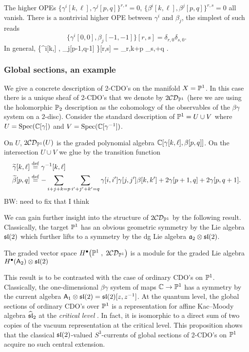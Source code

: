 \documentclass[11pt]{amsart}
\def\CDO{{\cC\cD}}
\def\brian#1{{\textcolor{blue!65!red}{BW: {#1}}}}
\begin{document}
The higher OPEs $\{\gamma^i[k,\ell], \gamma^j [p,q]\}^{r,s} = 0$, $\{\beta^i[k,\ell], \beta^j [p,q]\}^{r,s} = 0$ all vanish. 
There is a nontrivial higher OPE between $\gamma^i$ and $\beta_j$, the simplest of such reads
\[
\big\{\gamma^i[0,0] , \beta_j[-1,-1] \big\}[r,s] = \delta_{r,0} \delta_{s,0} .
\]
In general, 
\beqn\label{eqn:bgope}
\big\{\gamma^i[k,\ell] , \beta_j[p-1,q-1] \big\}[r,s] = \delta_{r,k+p} \delta_{s,\ell+q} .
\eeqn

\subsubsection{Global sections, an example}

We give a concrete description of 2-CDO's on the manifold $X = \PP^1$.
In this case there is a unique sheaf of 2-CDO's that we denote by $2\CDO_{\PP^1}$ (here we are using the holomorphic $\PP_2$ description as the cohomology of the observables of the $\beta\gamma$ system on a $2$-disc).
Consider the standard description of $\PP^1 = U \cup V$ where $U = {\rm Spec}(\CC[\gamma])$ and $V = {\rm Spec}(\CC[\gamma^{-1}])$. 

On $U$, $2\CDO_{\PP^1}(U)$ is the graded polynomial algebra $\CC[\gamma[k,\ell], \beta[p,q]]$. 
On the intersection $U \cup V$ we glue by the transition function
\begin{align*}
\Tilde{\gamma} [k,\ell] & \define \gamma^{-1} [k,\ell] \\
\Tilde{\beta} [p,q] & \define - \sum_{i+j+k=p} \sum_{i'+j'+k'=q} \gamma[i,i'] \gamma[j,j'] \beta[k,k'] + 2 \gamma[p+1, q] + 2 \gamma[p, q+1] .
\end{align*}
\brian{need to fix that I think}

We can gain further insight into the structure of $2\CDO_{\PP^1}$ by the following result. 
Classically, the target $\PP^1$ has an obvious geometric symmetry by the Lie algebra $\sl(2)$ which further lifts to a symmetry by the dg Lie algebra $\fa_2 \otimes \sl(2)$. 

\begin{prop}
The graded vector space $H^\bu \big(\PP^1 \; , \; 2 \CDO_{\PP^1}\big)$ is a module for the graded Lie algebra $H^\bu(\sfA_2) \otimes \sl(2)$
\end{prop}

\begin{rmk}
This result is to be contrasted with the case of ordinary CDO's on $\PP^1$. 
Classically, the one-dimensional $\beta\gamma$ system of maps $\CC \to \PP^1$ has a symmetry by the current algebra $\sfA_1 \otimes \sl(2) = \sl(2)[z,z^{-1}]$. 
At the quantum level, the global sections of ordinary CDO's over $\PP^1$ is a representation for affine Kac--Moody algebra $\Hat{\sl}_2$ at the {\em critical level} \cite[Theorem 5.7]{MSV}. 
In fact, it is isomorphic to a direct sum of two copies of the vacuum representation at the critical level.
This proposition shows that the classical $\sl(2)$-valued $S^3$-currents of global sections of 2-CDO's on $\PP^1$ acquire no such central extension. 
\end{rmk}
\end{document}
